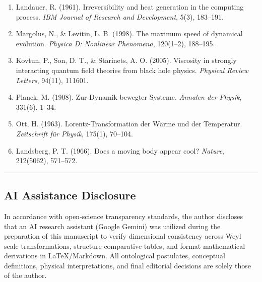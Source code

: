 \documentclass[
]{article}
\begin{document}
\begin{enumerate}
  superconductivity. \emph{Physical Review}, 108(5), 1175--1204.
\item
  Landauer, R. (1961). Irreversibility and heat generation in the
  computing process. \emph{IBM Journal of Research and Development},
  5(3), 183--191.
\item
  Margolus, N., \& Levitin, L. B. (1998). The maximum speed of dynamical
  evolution. \emph{Physica D: Nonlinear Phenomena}, 120(1--2), 188--195.
\item
  Kovtun, P., Son, D. T., \& Starinets, A. O. (2005). Viscosity in
  strongly interacting quantum field theories from black hole physics.
  \emph{Physical Review Letters}, 94(11), 111601.
\item
  Planck, M. (1908). Zur Dynamik bewegter Systeme. \emph{Annalen der
  Physik}, 331(6), 1--34.
\item
  Ott, H. (1963). Lorentz-Transformation der Wärme und der Temperatur.
  \emph{Zeitschrift für Physik}, 175(1), 70--104.
\item
  Landsberg, P. T. (1966). Does a moving body appear cool?
  \emph{Nature}, 212(5062), 571--572.
\end{enumerate}

\begin{center}\rule{0.5\linewidth}{0.5pt}\end{center}

\subsection{AI Assistance Disclosure}\label{ai-assistance-disclosure}

In accordance with open-science transparency standards, the author
discloses that an AI research assistant (Google Gemini) was utilized
during the preparation of this manuscript to verify dimensional
consistency across Weyl scale transformations, structure comparative
tables, and format mathematical derivations in LaTeX/Markdown. All
ontological postulates, conceptual definitions, physical
interpretations, and final editorial decisions are solely those of the
author.
\end{document}
